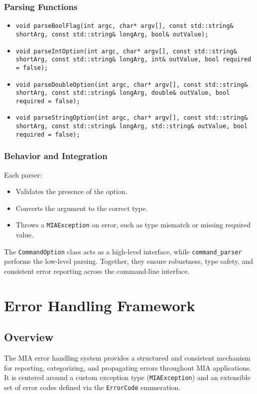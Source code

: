 \subsubsection*{Parsing Functions}
\begin{itemize}\itemsep0em
	\item \texttt{void parseBoolFlag(int argc, char* argv[], const std::string\& shortArg, const std::string\& longArg, bool\& outValue);}
	\item \texttt{void parseIntOption(int argc, char* argv[], const std::string\& shortArg, const std::string\& longArg, int\& outValue, bool required = false);}
	\item \texttt{void parseDoubleOption(int argc, char* argv[], const std::string\& shortArg, const std::string\& longArg, double\& outValue, bool required = false);}
	\item \texttt{void parseStringOption(int argc, char* argv[], const std::string\& shortArg, const std::string\& longArg, std::string\& outValue, bool required = false);}
\end{itemize}

\subsubsection*{Behavior and Integration}
Each parser:
\begin{itemize}\itemsep0em
	\item Validates the presence of the option.
	\item Converts the argument to the correct type.
	\item Throws a \texttt{MIAException} on error, such as type mismatch or missing required value.
\end{itemize}
The \texttt{CommandOption} class acts as a high-level interface, while \texttt{command\_parser} performs the low-level parsing. Together, they ensure robustness, type safety, and consistent error reporting across the command-line interface.














\section{Error Handling Framework}
\label{sec:error-handling}

\subsection*{Overview}
The MIA error handling system provides a structured and consistent mechanism for reporting, categorizing, and propagating errors throughout MIA applications. It is centered around a custom exception type (\texttt{MIAException}) and an extensible set of error codes defined via the \texttt{ErrorCode} enumeration.

